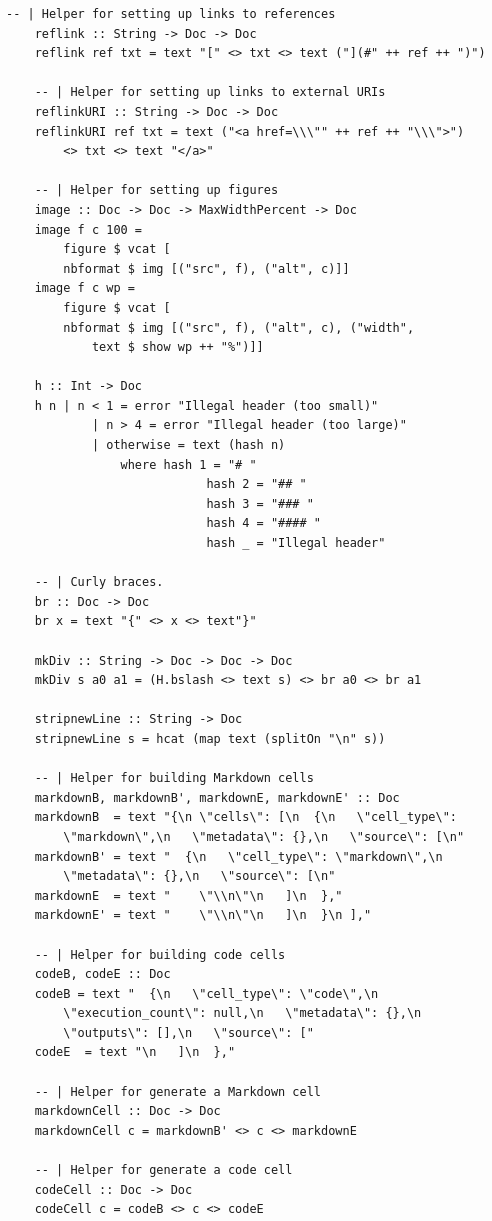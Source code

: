 \begin{lstlisting}[language=haskell1, 
	basicstyle=\linespread{1.1}\small\ttfamily]
	-- | Helper for setting up links to references
	reflink :: String -> Doc -> Doc
	reflink ref txt = text "[" <> txt <> text ("](#" ++ ref ++ ")")
	
	-- | Helper for setting up links to external URIs
	reflinkURI :: String -> Doc -> Doc
	reflinkURI ref txt = text ("<a href=\\\"" ++ ref ++ "\\\">") 
		<> txt <> text "</a>"
	
	-- | Helper for setting up figures
	image :: Doc -> Doc -> MaxWidthPercent -> Doc
	image f c 100 = 
		figure $ vcat [
		nbformat $ img [("src", f), ("alt", c)]]
	image f c wp =
		figure $ vcat [
		nbformat $ img [("src", f), ("alt", c), ("width", 
			text $ show wp ++ "%")]]
	
	h :: Int -> Doc
	h n | n < 1 = error "Illegal header (too small)"
			| n > 4 = error "Illegal header (too large)"          
			| otherwise = text (hash n)
				where hash 1 = "# "
							hash 2 = "## "
							hash 3 = "### "
							hash 4 = "#### "
							hash _ = "Illegal header"
	
	-- | Curly braces.
	br :: Doc -> Doc
	br x = text "{" <> x <> text"}"
	
	mkDiv :: String -> Doc -> Doc -> Doc
	mkDiv s a0 a1 = (H.bslash <> text s) <> br a0 <> br a1
	
	stripnewLine :: String -> Doc
	stripnewLine s = hcat (map text (splitOn "\n" s))
	
	-- | Helper for building Markdown cells
	markdownB, markdownB', markdownE, markdownE' :: Doc
	markdownB  = text "{\n \"cells\": [\n  {\n   \"cell_type\": 
		\"markdown\",\n   \"metadata\": {},\n   \"source\": [\n" 
	markdownB' = text "  {\n   \"cell_type\": \"markdown\",\n   
		\"metadata\": {},\n   \"source\": [\n" 
	markdownE  = text "    \"\\n\"\n   ]\n  },"
	markdownE' = text "    \"\\n\"\n   ]\n  }\n ],"
		
	-- | Helper for building code cells
	codeB, codeE :: Doc
	codeB = text "  {\n   \"cell_type\": \"code\",\n   
		\"execution_count\": null,\n   \"metadata\": {},\n   
		\"outputs\": [],\n   \"source\": [" 
	codeE  = text "\n   ]\n  },"
		
	-- | Helper for generate a Markdown cell
	markdownCell :: Doc -> Doc
	markdownCell c = markdownB' <> c <> markdownE
		
	-- | Helper for generate a code cell
	codeCell :: Doc -> Doc
	codeCell c = codeB <> c <> codeE
		

\end{lstlisting}
